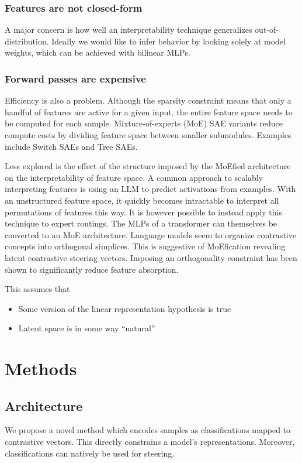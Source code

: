 \subsubsection{Features are not closed-form}
A major concern is how well an interpretability technique generalizes out-of-distribution.
Ideally we would like to infer behavior by looking solely at model weights,
which can be achieved with bilinear MLPs\cite{pearce2025}.

\subsubsection{Forward passes are expensive}
Efficiency is also a problem. Although the sparsity constraint means that only a handful of 
features are active for a given input, the entire feature space needs to be computed\cite{} for each sample.
Mixture-of-experts (MoE) SAE variants reduce compute costs by dividing feature space between smaller
submodules. Examples include Switch SAEs\cite{mudide2025} and Tree SAEs\cite{cao2026}.

Less explored is the effect of the structure imposed by the MoEfied architecture on the interpretability of feature space.
A common approach to scalably interpreting features is using an LLM to predict activations from examples\cite{paulo2025}.
With an unstructured feature space, it quickly becomes intractable to interpret all 
permutations of features this way. It is however possible to instead apply this technique to 
expert routings.
The MLPs of a transformer can themselves be converted to an MoE architecture\cite{zhang2022}.
Language models seem to organize contrastive concepts into orthogonal simplices\cite{park2025}.
This is suggestive of MoEfication revealing latent contrastive steering vectors.
Imposing an orthogonality constraint has been shown to significantly reduce feature
absorption\cite{korznikov2025}.

This assumes that
\begin{itemize}
	\item Some version of the linear representation hypothesis is true
	\item Latent space is in some way ``natural''
\end{itemize}

\section{Methods}

\subsection{Architecture}
We propose a novel method which encodes samples as classifications mapped to contrastive vectors.
This directly constrains a model's representations.
Moreover, classifications can natively be used for steering.


